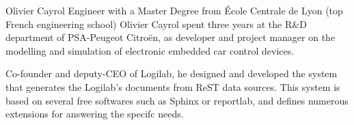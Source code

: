 \begin{participant}[type=lead PI,PM=4]{Olivier Cayrol}
  Engineer with a Master Degree from École Centrale de Lyon (top
  French engineering school) Olivier Cayrol spent three years at the
  R\&D department of PSA-Peugeot Citroën, as developer and project
  manager on the modelling and simulation of electronic embedded car
  control devices.

  Co-founder and deputy-CEO of Logilab, he designed and developed the
  system that generates the Logilab's documents from ReST data
  sources. This system is based on several free softwares such as
  Sphinx or reportlab, and defines numerous extensions for answering
  the specifc needs.
\end{participant}
